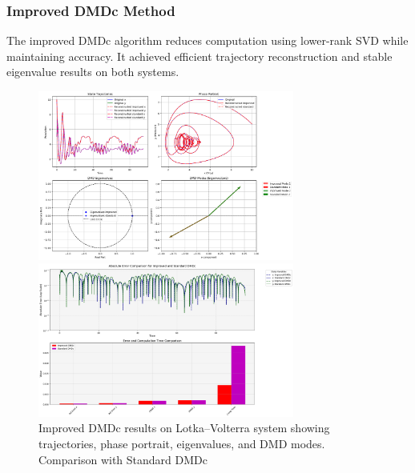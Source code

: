 \documentclass[a4paper,12pt]{report}
\theoremstyle{definition}
\numberwithin{equation}{section}
\begin{document}
\newpage
\subsubsection*{Improved DMDc Method}

The improved DMDc algorithm reduces computation using lower-rank SVD while maintaining accuracy. It achieved efficient trajectory reconstruction and stable eigenvalue results on both systems\cite{proctor2018}.
\begin{figure}[h!]
    \centering
    \includegraphics[width=0.75\textwidth]{IPROVED LV.png}
    
    \vspace{1em}    
    \includegraphics[width=0.75\textwidth]{IPROVED_LV_error_time.png}

    
    \caption{Improved DMDc results on Lotka–Volterra system showing trajectories, phase portrait, eigenvalues, and DMD modes. Comparison with Standard DMDc}
\end{figure}
\end{document}
